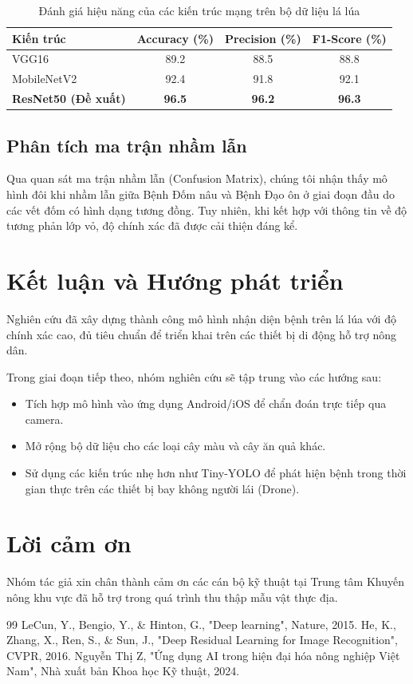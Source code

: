 \documentclass[11pt,a4paper]{article}
\begin{document}
\begin{table}[h]
\centering
\caption{Đánh giá hiệu năng của các kiến trúc mạng trên bộ dữ liệu lá lúa}
\label{table:cnn_compare}
\vspace{0.3cm}
\begin{tabular}{lccc}
\toprule
\textbf{Kiến trúc} & \textbf{Accuracy (\%)} & \textbf{Precision (\%)} & \textbf{F1-Score (\%)} \\
\midrule
VGG16 & 89.2 & 88.5 & 88.8 \\
MobileNetV2 & 92.4 & 91.8 & 92.1 \\
\textbf{ResNet50 (Đề xuất)} & \textbf{96.5} & \textbf{96.2} & \textbf{96.3} \\
\bottomrule
\end{tabular}
\end{table}

\subsection{Phân tích ma trận nhầm lẫn}
Qua quan sát ma trận nhầm lẫn (Confusion Matrix), chúng tôi nhận thấy mô hình đôi khi nhầm lẫn giữa Bệnh Đốm nâu và Bệnh Đạo ôn ở giai đoạn đầu do các vết đốm có hình dạng tương đồng. Tuy nhiên, khi kết hợp với thông tin về độ tương phản lớp vỏ, độ chính xác đã được cải thiện đáng kể.

\section{Kết luận và Hướng phát triển}
Nghiên cứu đã xây dựng thành công mô hình nhận diện bệnh trên lá lúa với độ chính xác cao, đủ tiêu chuẩn để triển khai trên các thiết bị di động hỗ trợ nông dân.

Trong giai đoạn tiếp theo, nhóm nghiên cứu sẽ tập trung vào các hướng sau:
\begin{itemize}
    \item Tích hợp mô hình vào ứng dụng Android/iOS để chẩn đoán trực tiếp qua camera.
    \item Mở rộng bộ dữ liệu cho các loại cây màu và cây ăn quả khác.
    \item Sử dụng các kiến trúc nhẹ hơn như Tiny-YOLO để phát hiện bệnh trong thời gian thực trên các thiết bị bay không người lái (Drone).
\end{itemize}

\section*{Lời cảm ơn}
Nhóm tác giả xin chân thành cảm ơn các cán bộ kỹ thuật tại Trung tâm Khuyến nông khu vực đã hỗ trợ trong quá trình thu thập mẫu vật thực địa.

\begin{thebibliography}{99}
 LeCun, Y., Bengio, Y., \& Hinton, G., "Deep learning", Nature, 2015.
 He, K., Zhang, X., Ren, S., \& Sun, J., "Deep Residual Learning for Image Recognition", CVPR, 2016.
 Nguyễn Thị Z, "Ứng dụng AI trong hiện đại hóa nông nghiệp Việt Nam", Nhà xuất bản Khoa học Kỹ thuật, 2024.
\end{thebibliography}
\end{document}
